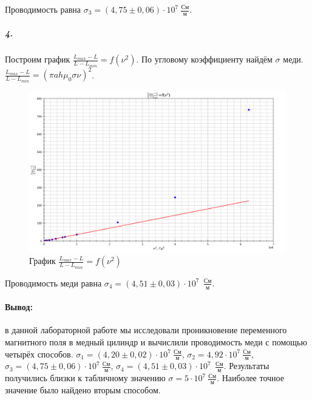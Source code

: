 \documentclass[a4paper,12pt]{article}
\begin{document}
\newpage
Проводимость равна $\sigma_3 = (4,75\pm 0,06)\cdot 10^7~ \frac{См}{м}$.
\subparagraph{4.} Построим график $\frac{L_{max} - L}{L - L_{min}}=f(\nu^2)$. По угловому коэффициенту найдём $\sigma$ меди. $\frac{L_{max} - L}{L - L_{min}}=(\pi ah\mu_0 \sigma \nu)^2$.\par
\begin{figure}[!h]
\centering
\includegraphics[width=0.9\linewidth]{graph4.png}
\caption{График $\frac{L_{max} - L}{L - L_{min}}=f(\nu^2)$}
\label{fig:mpr}
\end{figure}
Проводимость меди равна $\sigma_4 = (4,51\pm 0,03)\cdot 10^7~ ~\frac{См}{м}$.
\paragraph{Вывод:} в данной лабораторной работе мы исследовали проникновение переменного магнитного поля в медный цилиндр и вычислили проводимость меди с помощью четырёх способов. $\sigma_1 = (4,20\pm 0,02)\cdot 10^7~\frac{См}{м}$, $\sigma_2 = 4,92 \cdot 10^7 ~\frac{См}{м}$, $\sigma_3 = (4,75\pm 0,06)\cdot 10^7~ \frac{См}{м}$, $\sigma_4 = (4,51\pm 0,03)\cdot 10^7~ ~\frac{См}{м}$. Результаты получились близки к табличному значению $\sigma = 5\cdot 10^7 ~\frac{См}{м}$. Наиболее точное значение было найдено вторым способом.
\end{document}
